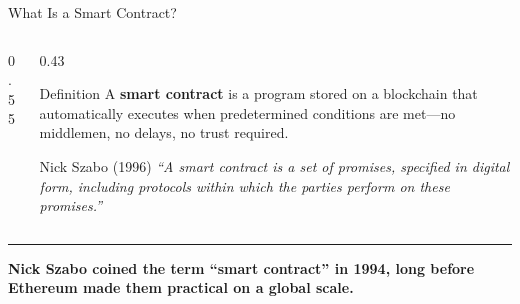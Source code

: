 \documentclass[8pt,aspectratio=169]{beamer}
\newcommand{\bottomnote}[1]{%
\vfill
\vspace{-2mm}
\textcolor{mllavender2}{\rule{\textwidth}{0.4pt}}
\vspace{1mm}
\footnotesize
\textbf{#1}
}
\begin{document}
\begin{frame}{What Is a Smart Contract?}
\begin{columns}[T]
\begin{column}{0.55\textwidth}
\begin{center}
\end{center}
\end{column}
\begin{column}{0.43\textwidth}
\vspace{4mm}
\begin{block}{Definition}
\small A \textbf{smart contract} is a program stored on a blockchain that automatically executes when predetermined conditions are met---no middlemen, no delays, no trust required.
\end{block}
\vspace{3mm}
\begin{block}{Nick Szabo (1996)}
\small\itshape ``A smart contract is a set of promises, specified in digital form, including protocols within which the parties perform on these promises.''
\end{block}
\end{column}
\end{columns}
\bottomnote{Nick Szabo coined the term ``smart contract'' in 1994, long before Ethereum made them practical on a global scale.}
\end{frame}
\end{document}
